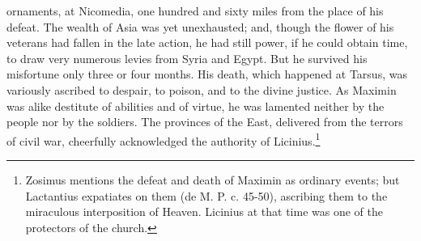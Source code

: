 ornaments, at Nicomedia, one hundred and sixty miles from the place of his defeat. The wealth of Asia was yet unexhausted; and, though the flower of his veterans had fallen in the late action, he had still power, if he could obtain time, to draw very numerous levies from Syria and Egypt. But he survived his misfortune only three or four months. His death, which happened at Tarsus, was variously ascribed to despair, to poison, and to the divine justice. As Maximin was alike destitute of abilities and of virtue, he was lamented neither by the people nor by the soldiers. The provinces of the East, delivered from the terrors of civil war, cheerfully acknowledged the authority of Licinius.\footnote{Zosimus mentions the defeat and death of Maximin as ordinary events; but Lactantius expatiates on them (de M. P. c. 45-50), ascribing them to the miraculous interposition of Heaven. Licinius at that time was one of the protectors of the church.}

